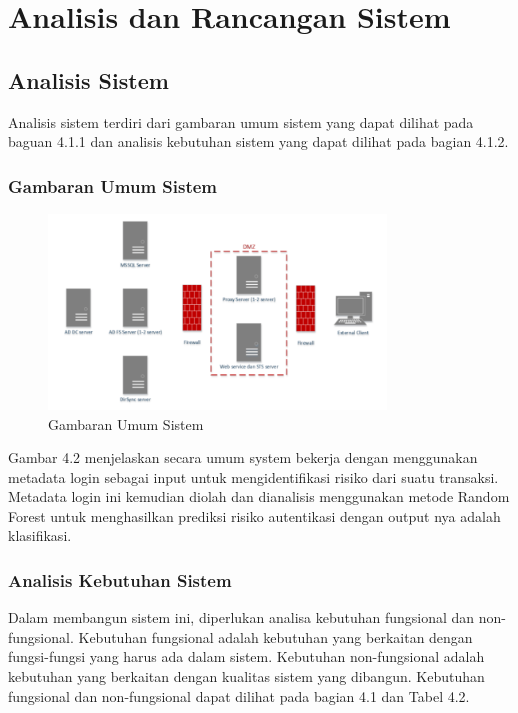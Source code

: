 \chapter{Analisis dan Rancangan Sistem}

\section{Analisis Sistem}

Analisis sistem terdiri dari gambaran umum sistem yang dapat dilihat pada baguan 4.1.1 dan analisis kebutuhan sistem yang dapat dilihat pada bagian 4.1.2.

\subsection{Gambaran Umum Sistem}
\begin{figure}
    \centering
    \includegraphics[width=0.8\textwidth]{contents/chapter-4/gambar-buatan-sendiri.PNG}
    \caption{Gambaran Umum Sistem}
    \label{fig:my_label}
\end{figure}
Gambar 4.2 menjelaskan secara umum system bekerja dengan menggunakan metadata login sebagai input untuk mengidentifikasi risiko dari suatu transaksi. Metadata login ini kemudian diolah dan dianalisis menggunakan metode Random Forest untuk menghasilkan prediksi risiko autentikasi dengan output nya adalah klasifikasi.

\subsection{Analisis Kebutuhan Sistem}
Dalam membangun sistem ini, diperlukan analisa kebutuhan fungsional dan non-fungsional. Kebutuhan fungsional adalah kebutuhan yang berkaitan dengan fungsi-fungsi yang harus ada dalam sistem. Kebutuhan non-fungsional adalah kebutuhan yang berkaitan dengan kualitas sistem yang dibangun. Kebutuhan fungsional dan non-fungsional dapat dilihat pada bagian 4.1 dan Tabel 4.2.

